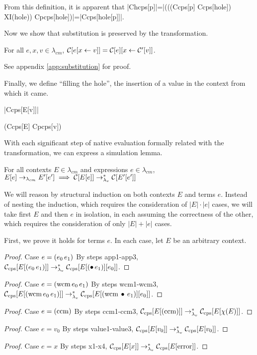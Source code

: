 From this definition, it is apparent that \scheme|Chcps[p]|=\scheme|(((Ccps[p] Ccps[hole]) XI(hole)) Cpcps[hole])|=\scheme|Ccps[hole[p]]|.

Now we show that substitution is preserved by the transformation.

\begin{lemma}[Substitution]
\label{lem:substitution}
For all $e,x,v\in\lambda_{cm}$, $\mathcal{C}[e[x\leftarrow v]]=\mathcal{C}[e][x\leftarrow \mathcal{C}'[v]]$.
\end{lemma}

See appendix \ref{app:substitution} for proof.

Finally, we define ``filling the hole'', the insertion of a value in the context from which it came.

\begin{schemedefinition}{\scheme|Ccps[E[v]]|}
\begin{schemeblock}
\begin{schemedisplay}
(Ccps[E] Cpcps[v])
\end{schemedisplay}
\end{schemeblock}
\end{schemedefinition}

With each significant step of native evaluation formally related with the transformation, we can express a simulation lemma.

\begin{lemma}[Simulation]
For all contexts $E\in\lambda_{cm}$ and expressions $e\in\lambda_{cm}$, $E[e]\rightarrow_{\lambda_{cm}} E'[e']\implies\mathcal{C}[E[e]]\rightarrow_{\lambda_v}^{*}\mathcal{C}[E'[e']]$
\end{lemma}

We will reason by structural induction on both contexts $E$ and terms $e$. Instead of
nesting the induction, which requires the consideration of $|E|\cdot|e|$ cases, we will
take first $E$ and then $e$ in isolation, in each assuming the correctness of the other,
which requires the consideration of only $|E|+|e|$ cases.

First, we prove it holds for terms $e$. In each case, let $E$ be an arbitrary context.
\begin{proof}{Case $e=(e_0\,e_1)$}
By steps app1-app3, $\mathcal{C}_{\mathrm{cps}}[E[(e_0\,e_1)]]\rightarrow_{\lambda_v}^{*}\mathcal{C}_{\mathrm{cps}}[E[(\bullet\,e_1)][e_0]]$.
\end{proof}
\begin{proof}{Case $e=(\mathrm{wcm}\,e_0\,e_1)$}
By steps wcm1-wcm3, $\mathcal{C}_{\mathrm{cps}}[E[(\mathrm{wcm}\,e_0\,e_1)]]\rightarrow_{\lambda_v}^{*}\mathcal{C}_{\mathrm{cps}}[E[(\mathrm{wcm}\,\bullet\,e_1)][e_0]]$.
\end{proof}
\begin{proof}{Case $e=(\mathrm{ccm})$}
By steps ccm1-ccm3, $\mathcal{C}_{\mathrm{cps}}[E[(\mathrm{ccm})]]\rightarrow_{\lambda_v}^{*}\mathcal{C}_{\mathrm{cps}}[E[\chi(E)]]$.
\end{proof}
\begin{proof}{Case $e=v_0$}
By steps value1-value3, $\mathcal{C}_{\mathrm{cps}}[E[v_0]]\rightarrow_{\lambda_v}^{*}\mathcal{C}_{\mathrm{cps}}[E[v_0]]$.
\end{proof}
\begin{proof}{Case $e=x$}
By steps x1-x4, $\mathcal{C}_{\mathrm{cps}}[E[x]]\rightarrow_{\lambda_v}^{*}\mathcal{C}_{\mathrm{cps}}[E[\mathrm{error}]]$.
\end{proof}

